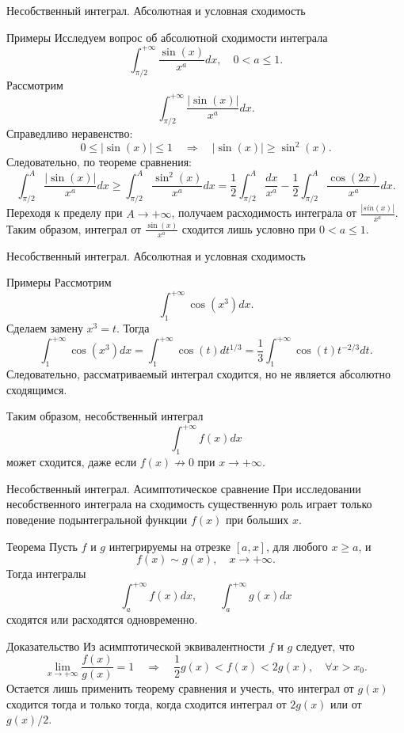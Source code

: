 \documentclass[8pt]{beamer}
\begin{document}
\begin{frame}{Несобственный интеграл. Абсолютная и условная сходимость}
\begin{block}{Примеры}
Исследуем вопрос об абсолютной сходимости интеграла
$$\int_{\pi/2}^{+\infty} \frac{\sin(x)}{x^a}dx, \quad 0<a\le 1.$$
Рассмотрим
$$\int_{\pi/2}^{+\infty} \frac{|\sin(x)|}{x^a}dx.$$
Справедливо неравенство:
$$0\le |\sin(x)|\le 1\quad \Rightarrow \quad |\sin(x)|\ge \sin^2(x).$$
Следовательно, по теореме сравнения:
$$\int_{\pi/2}^{A} \frac{|\sin(x)|}{x^a}dx\ge \int_{\pi/2}^{A} \frac{\sin^2(x)}{x^a}dx =\frac{1}{2} \int_{\pi/2}^{A} \frac{dx}{x^a} - \frac{1}{2}\int_{\pi/2}^A \frac{\cos(2x)}{x^a}dx.$$
Переходя к пределу при $A\to+\infty$, получаем расходимость интеграла от $\displaystyle \frac{|sin(x)|}{x^a}$. Таким образом, интеграл от $\displaystyle \frac{\sin(x)}{x^a}$ сходится лишь условно при $0<a\le1$.
\end{block}
\end{frame}

\begin{frame}{Несобственный интеграл. Абсолютная и условная сходимость}
\begin{block}{Примеры}
Рассмотрим
$$\int_1^{+\infty} \cos(x^3)dx.$$
Сделаем замену $x^3=t$. Тогда
$$\int_1^{+\infty} \cos(x^3)dx = \int_{1}^{+\infty} \cos(t)dt^{1/3} =  \frac{1}{3}\int_{1}^{+\infty} \cos(t) t^{-2/3}dt.$$
Следовательно, рассматриваемый интеграл сходится, но не является абсолютно сходящимся.
\end{block}
Таким образом, несобственный интеграл
$$\int_1^{+\infty} f(x)dx$$
может сходится, даже если $f(x)\not\to 0$ при $x\to+\infty$. 
\end{frame}

\begin{frame}{Несобственный интеграл. Асимптотическое сравнение}
При исследовании несобственного интеграла на сходимость существенную роль играет только поведение подынтегральной функции $f(x)$ при больших $x$.
\begin{block}{Теорема}
Пусть $f$ и $g$ интегрируемы на отрезке $[a,x]$, для любого $x\ge a$, и
$$f(x) \sim g(x),\quad x\to+\infty.$$
Тогда интегралы
$$\int_a^{+\infty} f(x) dx,\qquad \int_a^{+\infty}g(x)dx$$
сходятся или расходятся одновременно. 
\end{block}
\begin{block}{Доказательство}
Из асимптотической эквивалентности $f$ и $g$ следует, что
$$\lim_{x\to+\infty} \frac{f(x)}{g(x)} = 1 \quad \Rightarrow \quad 
\frac{1}{2}g(x)<f(x)<2g(x), \quad \forall x>x_0.$$
Остается лишь применить теорему сравнения и учесть, что интеграл от $g(x)$ сходится тогда и только тогда, когда сходится интеграл от $2 g(x)$ или от $g(x)/2$.
\end{block}
\end{frame}
\end{document}
